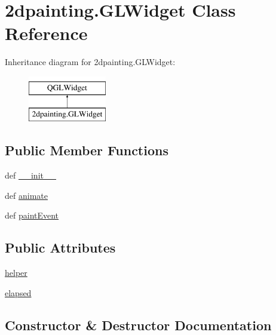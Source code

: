 \hypertarget{class2dpainting_1_1GLWidget}{}\section{2dpainting.G\+L\+Widget Class Reference}
\label{class2dpainting_1_1GLWidget}
Inheritance diagram for 2dpainting.G\+L\+Widget\+:\begin{figure}[H]
\begin{center}
\leavevmode
\includegraphics[height=2.000000cm]{class2dpainting_1_1GLWidget}
\end{center}
\end{figure}
\subsection*{Public Member Functions}
\begin{DoxyCompactItemize}
\item 
def \hyperlink{class2dpainting_1_1GLWidget_a5f7409e40723e13e92732b82f44f692f}{\+\_\+\+\_\+init\+\_\+\+\_\+}
\item 
def \hyperlink{class2dpainting_1_1GLWidget_a11b1ecf91a01c4ddadc3130297b057cf}{animate}
\item 
def \hyperlink{class2dpainting_1_1GLWidget_a6c548f62612bc88c97b3b7a84ec0fc37}{paint\+Event}
\end{DoxyCompactItemize}
\subsection*{Public Attributes}
\begin{DoxyCompactItemize}
\item 
\hyperlink{class2dpainting_1_1GLWidget_a0795146d5f73b5c3d0c6199bd8675bc5}{helper}
\item 
\hyperlink{class2dpainting_1_1GLWidget_ac4ad9978c23cd33694f3c39effc44a13}{elapsed}
\end{DoxyCompactItemize}


\subsection{Constructor \& Destructor Documentation}
\hypertarget{class2dpainting_1_1GLWidget_a5f7409e40723e13e92732b82f44f692f}{}
